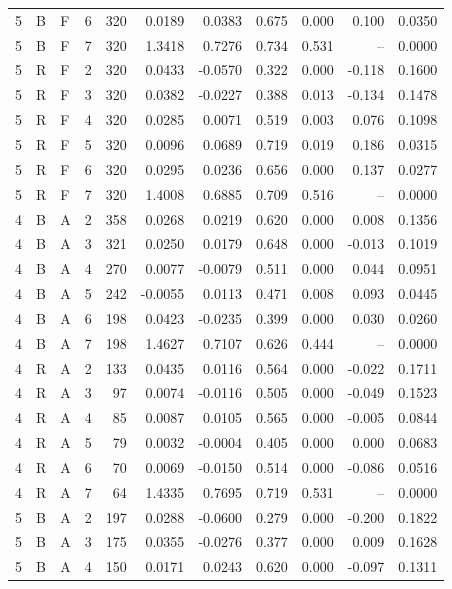 \documentclass[10pt,a4paper]{article}
\begin{document}
\begin{longtable}{rllrrrrrrrr}
5 & B & F & 6 & 320 & 0.0189 & 0.0383 & 0.675 & 0.000 & 0.100 & 0.0350 \\
5 & B & F & 7 & 320 & 1.3418 & 0.7276 & 0.734 & 0.531 & -- & 0.0000 \\
5 & R & F & 2 & 320 & 0.0433 & -0.0570 & 0.322 & 0.000 & -0.118 & 0.1600 \\
5 & R & F & 3 & 320 & 0.0382 & -0.0227 & 0.388 & 0.013 & -0.134 & 0.1478 \\
5 & R & F & 4 & 320 & 0.0285 & 0.0071 & 0.519 & 0.003 & 0.076 & 0.1098 \\
5 & R & F & 5 & 320 & 0.0096 & 0.0689 & 0.719 & 0.019 & 0.186 & 0.0315 \\
5 & R & F & 6 & 320 & 0.0295 & 0.0236 & 0.656 & 0.000 & 0.137 & 0.0277 \\
5 & R & F & 7 & 320 & 1.4008 & 0.6885 & 0.709 & 0.516 & -- & 0.0000 \\
4 & B & A & 2 & 358 & 0.0268 & 0.0219 & 0.620 & 0.000 & 0.008 & 0.1356 \\
4 & B & A & 3 & 321 & 0.0250 & 0.0179 & 0.648 & 0.000 & -0.013 & 0.1019 \\
4 & B & A & 4 & 270 & 0.0077 & -0.0079 & 0.511 & 0.000 & 0.044 & 0.0951 \\
4 & B & A & 5 & 242 & -0.0055 & 0.0113 & 0.471 & 0.008 & 0.093 & 0.0445 \\
4 & B & A & 6 & 198 & 0.0423 & -0.0235 & 0.399 & 0.000 & 0.030 & 0.0260 \\
4 & B & A & 7 & 198 & 1.4627 & 0.7107 & 0.626 & 0.444 & -- & 0.0000 \\
4 & R & A & 2 & 133 & 0.0435 & 0.0116 & 0.564 & 0.000 & -0.022 & 0.1711 \\
4 & R & A & 3 & 97 & 0.0074 & -0.0116 & 0.505 & 0.000 & -0.049 & 0.1523 \\
4 & R & A & 4 & 85 & 0.0087 & 0.0105 & 0.565 & 0.000 & -0.005 & 0.0844 \\
4 & R & A & 5 & 79 & 0.0032 & -0.0004 & 0.405 & 0.000 & 0.000 & 0.0683 \\
4 & R & A & 6 & 70 & 0.0069 & -0.0150 & 0.514 & 0.000 & -0.086 & 0.0516 \\
4 & R & A & 7 & 64 & 1.4335 & 0.7695 & 0.719 & 0.531 & -- & 0.0000 \\
5 & B & A & 2 & 197 & 0.0288 & -0.0600 & 0.279 & 0.000 & -0.200 & 0.1822 \\
5 & B & A & 3 & 175 & 0.0355 & -0.0276 & 0.377 & 0.000 & 0.009 & 0.1628 \\
5 & B & A & 4 & 150 & 0.0171 & 0.0243 & 0.620 & 0.000 & -0.097 & 0.1311 \\

\end{longtable}
\end{document}
